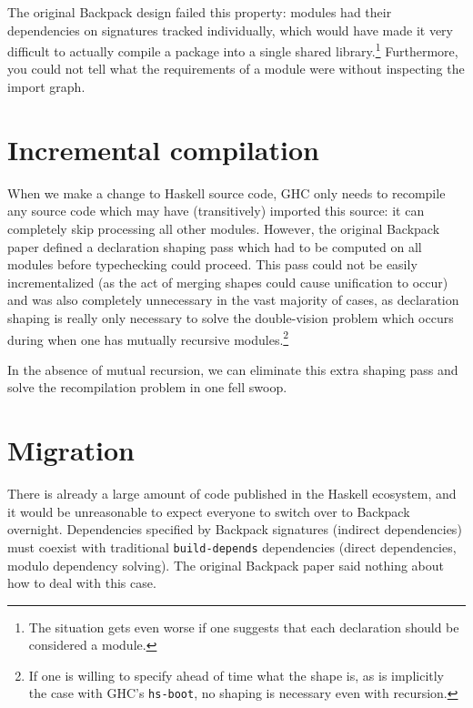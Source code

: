 The original Backpack design failed this property: modules had
their dependencies on signatures tracked individually, which would have
made it very difficult to actually compile a package into a single
shared library.\footnote{The situation gets even worse if one suggests
that each declaration should be considered a module.}  Furthermore, you
could not tell what the requirements of a module were without inspecting
the import graph.

\section{Incremental compilation}

When we make a change to Haskell source code, GHC only needs to recompile
any source code which may have (transitively) imported this source:
it can completely skip processing all other modules.  However, the
original Backpack paper defined a declaration shaping pass which had
to be computed on all modules before typechecking could proceed.  This
pass could not be easily incrementalized (as the act of merging shapes
could cause unification to occur) and was also completely unnecessary
in the vast majority of cases, as declaration shaping is really only
necessary to solve the double-vision problem which occurs during when
one has mutually recursive modules.\footnote{If one is willing to
specify ahead of time what the shape is, as is implicitly the case with GHC's
\texttt{hs-boot}, no shaping is necessary even with recursion.}

In the absence of mutual recursion, we can eliminate this extra shaping
pass and solve the recompilation problem in one fell swoop.


\section{Migration}

There is already a large amount of code published in the Haskell
ecosystem, and it would be unreasonable to expect everyone to switch
over to Backpack overnight.  Dependencies specified by Backpack
signatures (indirect dependencies) must coexist with traditional
\verb|build-depends| dependencies (direct dependencies, modulo
dependency solving).  The original Backpack paper said nothing about
how to deal with this case.
